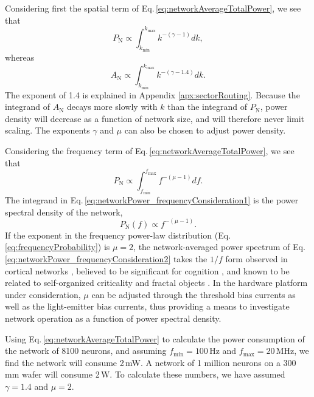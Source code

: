 \documentclass[twocolumn]{article}
\begin{document}
Considering first the spatial term of Eq.\,\ref{eq:networkAverageTotalPower}, we see that 
\begin{equation}
\label{eq:networkPower_spatialConsideration1}
P_{\mathrm{N}} \propto \int_{k_{\mathrm{min}}}^{k_{\mathrm{max}}} k^{-(\gamma-1)}dk, 
\end{equation}
whereas
\begin{equation}
\label{eq:networkPower_spatialConsideration2}
A_{\mathrm{N}} \propto \int_{k_{\mathrm{min}}}^{k_{\mathrm{max}}} k^{-(\gamma-1.4)}dk. 
\end{equation}
The exponent of 1.4 is explained in Appendix \ref{apx:sectorRouting}. Because the integrand of $A_{\mathrm{N}}$ decays more slowly with $k$ than the integrand of $P_{\mathrm{N}}$, power density will decrease as a function of network size, and will therefore never limit scaling. The exponents $\gamma$ and $\mu$ can also be chosen to adjust power density.

Considering the frequency term of Eq.\,\ref{eq:networkAverageTotalPower}, we see that 
\begin{equation}
\label{eq:networkPower_frequencyConsideration1}
P_{\mathrm{N}} \propto \int_{f_{\mathrm{min}}}^{f_{\mathrm{max}}} f^{-(\mu-1)}df. 
\end{equation}
The integrand in Eq.\,\ref{eq:networkPower_frequencyConsideration1} is the power spectral density of the network, 
\begin{equation}
\label{eq:networkPower_frequencyConsideration2}
P_{\mathrm{N}}(f) \propto f^{-(\mu-1)}. 
\end{equation}
If the exponent in the frequency power-law distribution (Eq.\,\ref{eq:frequencyProbability}) is $\mu = 2$, the network-averaged power spectrum of Eq. \ref{eq:networkPower_frequencyConsideration2} takes the $1/f$ form observed in cortical networks \cite{budr2004}, believed to be significant for cognition \cite{bu2006}, and known to be related to self-organized criticality and fractal objects \cite{be2007,bata1987,yara2017}. In the hardware platform under consideration, $\mu$ can be adjusted through the threshold bias currents as well as the light-emitter bias currents, thus providing a means to investigate network operation as a function of power spectral density.

Using Eq.\,\ref{eq:networkAverageTotalPower} to calculate the power consumption of the network of 8100 neurons, and assuming $f_{\mathrm{min}} = 100$\,Hz and $f_{\mathrm{max}} = 20$\,MHz, we find the network will consume 2\,mW. A network of 1 million neurons on a 300\,mm wafer will consume 2\,W. To calculate these numbers, we have assumed $\gamma = 1.4$ and $\mu  = 2$.



\end{document}
